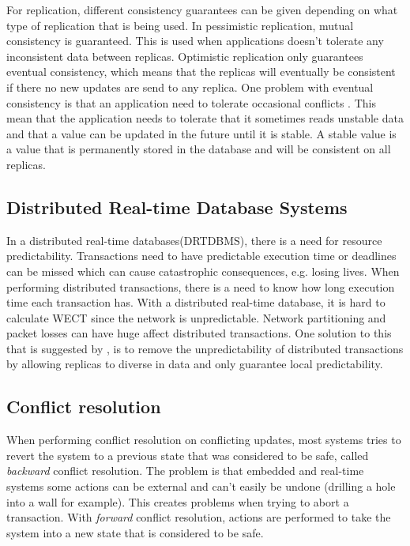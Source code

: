 For replication, different consistency guarantees can be given depending on what type of replication that is being used. In pessimistic replication, mutual consistency is guaranteed. This is used when applications doesn't tolerate any inconsistent data between replicas. Optimistic replication only guarantees eventual consistency, which means that the replicas will eventually be consistent if there no new updates are send to any replica. One problem with eventual consistency is that an application need to tolerate occasional conflicts \cite[]{saito2005}. This mean that the application needs to tolerate that it sometimes reads unstable data and that a value can be updated in the future until it is stable. A stable value is a value that is permanently stored in the database and will be consistent on all replicas.


\subsection{Distributed Real-time Database Systems} %
\label{sub:subsection_name}

In a distributed real-time databases(DRTDBMS), there is a need for resource predictability. Transactions need to have predictable execution time or deadlines can be missed which can cause catastrophic consequences, e.g. losing lives. When performing distributed transactions, there is a need to know how long execution time each transaction has. With a distributed real-time database, it is hard to calculate WECT since the network is unpredictable. Network partitioning and packet losses can have huge affect distributed transactions. One solution to this that is suggested by \cite{deeds}, is to remove the unpredictability of distributed transactions by allowing replicas to diverse in data and only guarantee local predictability.  

\subsection{Conflict resolution} %
\label{sub:conflict_resolution}

When performing conflict resolution on conflicting updates, most systems tries to revert the system to a previous state that was considered to be safe, called \emph{backward} conflict resolution. The problem is that embedded and real-time systems some actions can be external and can't easily be undone (drilling a hole into a wall for example). This creates problems when trying to abort a transaction. 
With \emph{forward} conflict resolution, actions are performed to take the system into a new state that is considered to be safe.      

